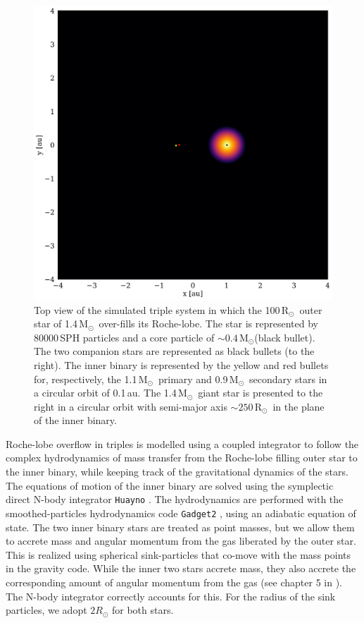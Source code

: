 \documentclass{aastex62}
\newcommand{\MSun}{\mbox{M$_\odot$}}
\newcommand{\RSun}{\mbox{R$_\odot$}}
\begin{document}
\begin{figure}[ht!]
  \includegraphics[width=\columnwidth]{fig_BBSS_gas_M14Msun_A010au_t0002.png}
\caption{Top view of the simulated triple system in which the
  100\,\RSun\, outer star of 1.4\,\MSun\, over-fills its
  Roche-lobe.  The star is represented by 80000\,SPH particles and a
  core particle of $\sim 0.4$\,\MSun (black bullet). The two companion
  stars are represented as black bullets (to the right).  The inner
  binary is represented by the yellow and red bullets for, respectively, the
  1.1\,\MSun\, primary and 0.9\,\MSun\, secondary stars in a circular
  orbit of 0.1\,au. The 1.4\,\MSun\, giant star is presented to the
  right in a circular orbit with semi-major axis $\sim 250$\,\RSun\, in the plane of the
  inner binary.
\label{fig:topview_at_t0}}
\end{figure}

Roche-lobe overflow in triples is modelled using a coupled integrator
to follow the complex hydrodynamics of mass transfer from the
Roche-lobe filling outer star to the inner binary, while keeping track
of the gravitational dynamics of the stars.  The equations of motion
of the inner binary are solved using the symplectic direct N-body
integrator \texttt{Huayno} \citep{2012NewA...17..711P}. The
hydrodynamics are performed with the smoothed-particles hydrodynamics
code \texttt{Gadget2} \citep{2000ascl.soft03001S}, using an adiabatic
equation of state.  The two inner binary stars are treated as point
masses, but we allow them to accrete mass and angular momentum from
the gas liberated by the outer star.  This is realized using spherical
sink-particles that co-move with the mass points in the gravity
code. While the inner two stars accrete mass, they also accrete the
corresponding amount of angular momentum from the gas (see chapter 5
in \cite{AMUSE}).  The N-body integrator correctly accounts for this.
For the radius of the sink particles, we adopt $2 R_\odot$ for both
stars.
\end{document}
